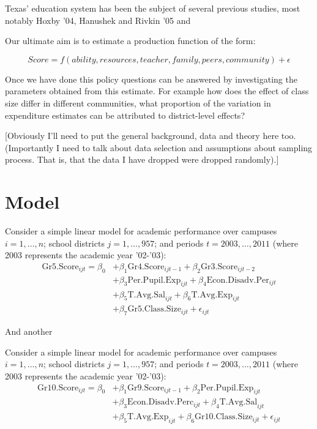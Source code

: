 \documentclass[11pt]{article}
\begin{document}
Texas' education system has been the subject of several previous studies, most notably Hoxby '04, Hanushek and Rivkin '05 and



Our ultimate aim is to estimate a production function of the form:

$$Score = f(ability,resources,teacher,family,peers,community) + \epsilon$$

Once we have done this policy questions can be answered by investigating the parameters obtained from this estimate. For example how does the effect of class size differ in different communities, what proportion of the variation in expenditure estimates can be attributed to district-level effects?

[Obviously I'll need to put the general background, data and theory here too. (Importantly I need to talk about data selection and assumptions about sampling process. That is, that the data I have dropped were dropped randomly).]

\section{Model}
\label{s:next}

Consider a simple linear model for academic performance over campuses $i=1,\ldots,n$; school districts $j=1,\ldots,957$; and periods $t=2003,\ldots,2011$ (where 2003 represents the academic year '02-'03):
  \begin{align*}
\mathrm{Gr5.Score}_{ijt} = \beta_{0}
&+ \beta_{1}  \mathrm{Gr4.Score}_{ijt-1}
+ \beta_{2}  \mathrm{Gr3.Score}_{ijt-2}    \\
&+ \beta_{3}  \mathrm{Per.Pupil.Exp}_{ijt}
+ \beta_{4}  \mathrm{Econ.Disadv.Per}_{ijt} \\
&+ \beta_{5}  \mathrm{T.Avg.Sal}_{ijt}
+ \beta_{6}  \mathrm{T.Avg.Exp}_{ijt}  \\
&+ \beta_{7}  \mathrm{Gr5.Class.Size}_{ijt} + \epsilon_{ijt}
\end{align*}

And another

Consider a simple linear model for academic performance over campuses $i=1,\ldots,n$; school districts $j=1,\ldots,957$; and periods $t=2003,\ldots,2011$ (where 2003 represents the academic year '02-'03):
  \begin{align*}
\mathrm{Gr10.Score}_{ijt} = \beta_{0}
&+ \beta_{1}  \mathrm{Gr9.Score}_{ijt-1}
+ \beta_{2}  \mathrm{Per.Pupil.Exp}_{ijt} \\
&+ \beta_{3}  \mathrm{Econ.Disadv.Perc}_{ijt}
+ \beta_{4}  \mathrm{T.Avg.Sal}_{ijt}  \\
&+ \beta_{5}  \mathrm{T.Avg.Exp}_{ijt}
+ \beta_{6}  \mathrm{Gr10.Class.Size}_{ijt} + \epsilon_{ijt}
\end{align*}
\end{document}
